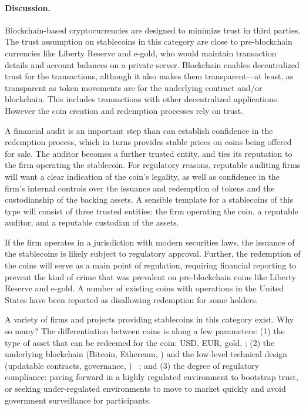 \paragraph{Discussion.} Blockchain-based cryptocurrencies are designed to minimize trust in third parties. The trust assumption on stablecoins in this category are close to pre-blockchain currencies like Liberty Reserve and e-gold, who would maintain transaction details and account balances on a private server. Blockchain enables decentralized trust for the transactions, although it also makes them transparent---at least, as transparent as token movements are for the underlying contract and/or blockchain. This includes transactions with other decentralized applications. However the coin creation and redemption processes rely on trust.

A financial audit is an important step than can establish confidence in the redemption process, which in turns provides stable prices on coins being offered for sale. The auditor becomes a further trusted entity, and ties its reputation to the firm operating the stablecoin. For regulatory reasons, reputable auditing firms will want a clear indication of the coin's legality, as well as confidence in the firm's internal controls over the issuance and redemption of tokens and the custodianship of the backing assets. A sensible template for a stablecoins of this type will consist of three trusted entities: the firm operating the coin, a reputable auditor, and a reputable custodian of the assets.

If the firm operates in a jurisdiction with modern securities laws, the issuance of the stablecoins is likely subject to regulatory approval. Further, the redemption of the coins will serve as a main point of regulation, requiring financial reporting to prevent the kind of crime that was prevalent on pre-blockchain coins like Liberty Reserve and e-gold. A number of existing coins with operations in the United States have been reported as disallowing redemption for some holders.


A variety of firms and projects providing stablecoins in this category exist. Why so many? The differentiation between coins is along a few parameters: (1) the type of asset that can be redeemed for the coin: USD, EUR, gold, \etc; (2) the underlying blockchain (\eg Bitcoin, Ethereum, \etc) and the low-level technical design (updatable contracts, governance, \etc) ~\cite{geminido29:online}; and (3) the degree of regulatory compliance: paving forward in a highly regulated environment to bootstrap trust, or seeking under-regulated environments to move to market quickly and avoid government surveillance for participants.

